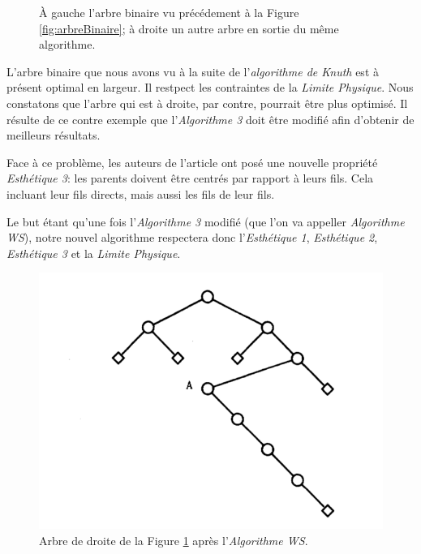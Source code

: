 \documentclass{article}
\begin{document}
\begin{figure}[h]
\begin{center}
\begin{right}
          \end{right}
        \end{center}
    	\caption{À gauche l'arbre binaire vu précédement à la Figure \ref{fig:arbreBinaire}; à droite un autre arbre en sortie du même algorithme.  \cite{article79}}
      \label{fig:arbresAlgo3}
    \end{figure}
    \vfill


    L'arbre binaire que nous avons vu à la suite de l'\emph{algorithme de Knuth} est à présent optimal en largeur. Il restpect les contraintes de la \emph{Limite Physique}. Nous constatons que l'arbre qui est à droite, par contre, pourrait être plus optimisé. Il résulte de ce contre exemple que l'\emph{Algorithme 3} doit être modifié afin d'obtenir de meilleurs résultats.

    Face à ce problème, les auteurs de l'article \cite{article79} ont posé une nouvelle propriété \emph{Esthétique 3}: les parents doivent être centrés par rapport à leurs fils. Cela incluant leur fils directs, mais aussi les fils de leur fils.

    Le but étant qu'une fois l'\emph{Algorithme 3} modifié (que l'on va appeller \emph{Algorithme WS}), notre nouvel algorithme respectera donc l'\emph{Esthétique 1}, \emph{Esthétique 2}, \emph{Esthétique 3} et la \emph{Limite Physique}.

    \vfill
    \begin{figure}[h]
        \begin{center}
      		\includegraphics[scale=0.5]{arbreWS.png}
        \end{center}
    	\caption{Arbre de droite de la Figure \ref{fig:arbresAlgo3} après l'\emph{Algorithme WS}. \cite{article79}}
      \label{fig:arbresAlgoWS}
    \end{figure}
    \vfill
\end{document}
